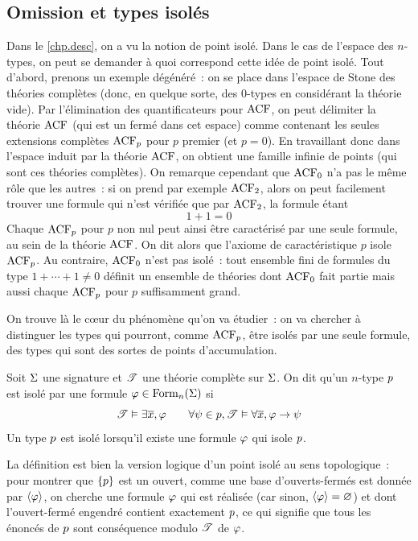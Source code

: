 \subsection{Omission et types isolés}

Dans le \cref{chp.desc}, on a vu la notion de point isolé. Dans le cas de
l'espace des $n$-types, on peut se demander à quoi correspond cette idée de
point isolé. Tout d'abord, prenons un exemple dégénéré~: on se place dans
l'espace de Stone des théories complètes (donc, en quelque sorte, des $0$-types
en considérant la théorie vide). Par l'élimination des quantificateurs pour
$\operatorname{ACF}$, on peut délimiter la théorie $\operatorname{ACF}$ (qui est un fermé dans cet
espace) comme contenant les seules extensions complètes $\operatorname{ACF}_p$ pour
$p$ premier (et $p = 0$). En travaillant donc dans l'espace induit par la
théorie $\operatorname{ACF}$, on obtient une famille infinie de points (qui sont ces
théories complètes). On remarque cependant que $\operatorname{ACF}_0$ n'a pas le même rôle
que les autres~: si on prend par exemple $\operatorname{ACF}_2$, alors on peut facilement
trouver une formule qui n'est vérifiée que par $\operatorname{ACF}_2$, la formule étant
\[1 + 1 = 0\]
Chaque $\operatorname{ACF}_p$ pour $p$ non nul peut ainsi être caractérisé par une seule
formule, au sein de la théorie $\operatorname{ACF}$. On dit alors que l'axiome de
caractéristique $p$ isole $\operatorname{ACF}_p$. Au contraire, $\operatorname{ACF}_0$ n'est pas isolé~:
tout ensemble fini de formules du type $1+\cdots+1\neq 0$ définit un ensemble
de théories dont $\operatorname{ACF}_0$ fait partie mais aussi chaque $\operatorname{ACF}_p$ pour $p$
suffisamment grand.

On trouve là le c\oe ur du phénomène qu'on va étudier~: on va chercher à
distinguer les types qui pourront, comme $\operatorname{ACF}_p$, être isolés par une seule
formule, des types qui sont des sortes de points d'accumulation.

\begin{definition}
  Soit $\Sigma$ une signature et $\mathscr T$ une théorie complète sur $\Sigma$. On
  dit qu'un $n$-type $p$ est isolé par une formule
  $\varphi\in\operatorname{Form}_n(\Sigma)$ si
  \[\mathscr T\vDash \exists \overline{x}, \varphi\qquad
  \forall \psi\in p, \mathscr T\vDash\forall \overline{x}, \varphi\to\psi\]
  Un type $p$ est isolé lorsqu'il existe une formule $\varphi$ qui isole
  $p$.
\end{definition}

\begin{remark}
  La définition est bien la version logique d'un point isolé au sens
  topologique~: pour montrer que $\{p\}$ est un ouvert, comme une
  base d'ouverts-fermés est donnée par $\langle\varphi\rangle$, on cherche une
  formule $\varphi$ qui est réalisée (car sinon, $\langle\varphi\rangle=\varnothing$)
  et dont l'ouvert-fermé engendré contient exactement $p$, ce qui
  signifie que tous les énoncés de $p$ sont conséquence modulo
  $\mathscr T$ de $\varphi$.
\end{remark}

